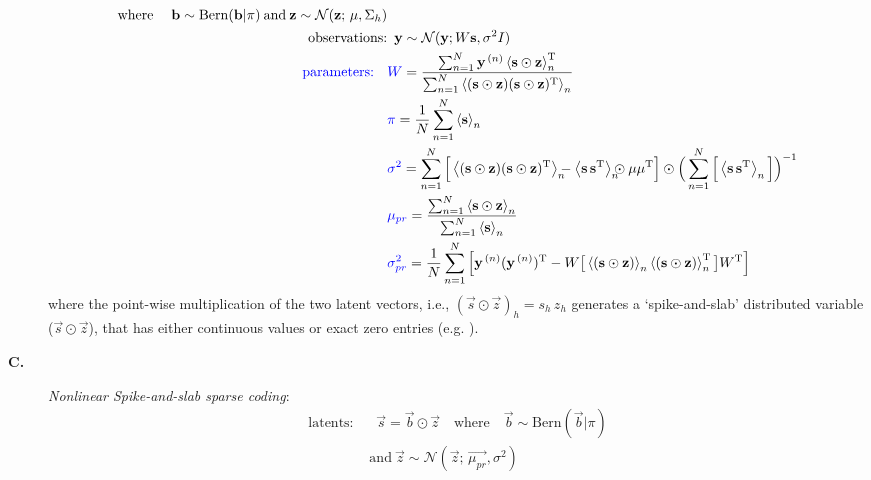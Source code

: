 \begin{description}
\begin{align}
\text{\quad}\mathrm{where\;}\quad \vec{b}\sim \mathrm{Bern}(\vec{b} | \pi)
\:\mathrm{and} \:
\vec{z} \sim \mathcal{N}(\vec{z};\,\vec{\mu} , \Sigma_h)\nonumber\\
\text{\quad}\text{observations:} & \,\,\, \vec{y} \sim \mathcal{N}(\vec{y}; W\vec{s}, \sigma^2\One)\text{\quad}\text{\quad}\nonumber\\%
\text{\quad}\text{\quad}\text{\quad}\text{\quad}\text{\quad}\rev{\text{\;\;parameters: }} \,\,\,   %
  &\rev{W} = \frac{\sum_{n=1}^{N} \yVecN \E{\sVec\odot\zVec}^{\TT}_n}
  {\sum_{n=1}^{N} \E{(\sVec\odot\zVec)(\sVec\odot\zVec)^{\TT}}_n } \nonumber\\
%
&\rev{\piVec} =
\frac{1}{N}\sum_{n=1}^{N}\E{\sVec}_n \nonumber\\
%
&\rev{\sigma^2} =
    \sum_{n=1}^{N} \Big[\E{(\sVec\odot\zVec)(\sVec\odot\zVec)^{\TT}}_n 
    \ssb -  \E{\sVec\,\sVec^{\TT}}_n \ssb \odot \muVec\muVec^{\TT} \Big] 
    \odot \Big(\sum_{n=1}^{N}\Big[\E{\sVec\,\sVec^{\TT}}_n \Big]\Big)^{-1} \nonumber\\
%
&\rev{\mu_{pr}}  = \frac{\sum_{n=1}^{N} \E{\sVec\odot\zVec}_n}{\sum_{n=1}^{N}\E{\sVec}_n}  \nonumber\\
%
&\rev{\sigma^{2}_{pr}} = \frac{1}{N}\sum_{n=1}^{N}\Big[ \yVecN(\yVecN)^{\TT}
        - W\big[\E{(\sVec\odot\zVec)}_n\E{(\sVec\odot\zVec)}_n^{\TT}\big]W^{\TT}\Big]  \nonumber
\end{align}
where the point-wise multiplication of the two latent vectors, i.e., $(\vec{s}\odot\vec{z})_h = s_h\,z_h$
generates a `spike-and-slab' distributed variable ($\vec{s}\odot\vec{z}$), that has either continuous values or exact zero entries (e.g. \citep{TitsiasGredilla2011,GoodfellowEtAl2013,SheikhEtAl2014}).
%
\item[\textbf{C.}] \textit{Nonlinear Spike-and-slab sparse coding}:
\vspace{-.2cm}
%
\begin{align}\label{eq:ssmca}
\text{latents: } & \,\,\,\vec{s} = \vec{b}\odot\vec{z} \nonumber
\quad\mathrm{where}\quad \vec{b}\sim \mathrm{Bern}(\vec{b} | \pi)\nonumber\\
\:&\mathrm{and} \:
\vec{z} \sim \mathcal{N}(\vec{z};\,\vec{\mu_{pr}} , \sigma^2) \nonumber\\ %

\end{align}
\end{description}
